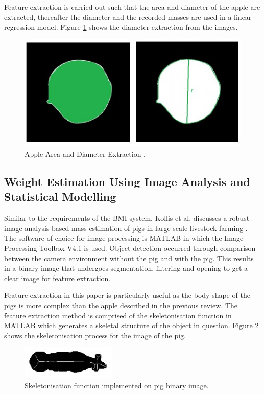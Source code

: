 \documentclass[conference]{IEEEtran}
\begin{document}
Feature extraction is carried out such that the area and diameter of the apple are extracted, thereafter the diameter and the recorded masses are used in a linear regression model.
Figure \ref{fig:diameterapples} shows the diameter extraction from the images.
\begin{figure}
    \centering
    \includegraphics[width=\linewidth]{diameterapples.jpg}
    \caption{Apple Area and Diameter Extraction  \cite{comert}.}
    \label{fig:diameterapples}
\end{figure}
\subsection{Weight Estimation Using Image Analysis and Statistical Modelling}
Similar to the requirements of the BMI system, Kollis et al. discusses a robust image analysis based mass estimation of pigs in large scale livestock farming \cite{kollis2007weight}. 
The software of choice for image processing is MATLAB in which the Image Processing Toolbox V4.1 is used.
Object detection occurred through comparison between the camera environment without the pig and with the pig.
This results in a binary image that undergoes segmentation, filtering and opening to get a clear image for feature extraction.

Feature extraction in this paper is particularly useful as the body shape of the pigs is more complex than the apple described in the previous review. 
The feature extraction method is comprised of the skeletonisation function in MATLAB which generates a skeletal structure of the object in question.
Figure \ref{fig:pigskeleton} shows the skeletonisation process for the image of the pig.
\begin{figure}
    \centering
    \includegraphics[width=\linewidth]{pigskeleton.jpg}
    \caption{Skeletonisation function implemented on pig binary image\cite{kollis2007weight}.}
    \label{fig:pigskeleton}
\end{figure}
\end{document}
